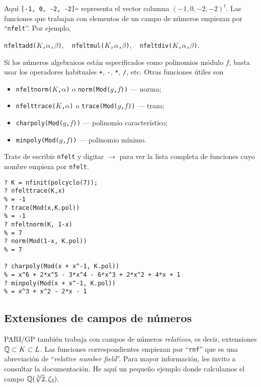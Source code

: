 Aquí \texttt{[-1, 0, -2, -2]\textasciitilde} representa el vector columna
$(-1,0,-2,-2)^t$. Las funciones que trabajan con elementos de un campo de
números empiezan por ``\texttt{nfelt}''. Por ejemplo,
\begin{center}
\texttt{nfeltadd($K$,$\alpha$,$\beta$)}, ~
\texttt{nfeltmul($K$,$\alpha$,$\beta$)}, ~
\texttt{nfeltdiv($K$,$\alpha$,$\beta$)}.
\end{center}
Si los números algebraicos están especificados como polinomios módulo $f$, basta
usar los operadores habituales \texttt{+}, \texttt{-}, \texttt{*}, \texttt{/},
etc. Otras funciones útiles son
\begin{itemize}
\item \texttt{nfeltnorm($K$,$\alpha$)} o \texttt{norm(Mod($g$,$f$))} --- norma;
\item \texttt{nfelttrace($K$,$\alpha$)} o \texttt{trace(Mod($g$,$f$))} --- traza;
\item \texttt{charpoly(Mod($g$,$f$))} --- polinomio característico;
\item \texttt{minpoly(Mod($g$,$f$))} --- polinomio mínimo.
\end{itemize}
Trate de escribir \texttt{nfelt} y digitar $\boxed{\to}$ para ver la lista
completa de funciones cuyo nombre empieza por \texttt{nfelt}.

\begin{shaded}
\begin{verbatim}
? K = nfinit(polcyclo(7));
? nfelttrace(K,x)
% = -1
? trace(Mod(x,K.pol))
% = -1
? nfeltnorm(K, 1-x)
% = 7
? norm(Mod(1-x, K.pol))
% = 7

? charpoly(Mod(x + x^-1, K.pol))
% = x^6 + 2*x^5 - 3*x^4 - 6*x^3 + 2*x^2 + 4*x + 1
? minpoly(Mod(x + x^-1, K.pol))
% = x^3 + x^2 - 2*x - 1
\end{verbatim}
\end{shaded}


\subsection{Extensiones de campos de números}

PARI/GP también trabaja con campos de números \emph{relativos}, es decir,
extensiones $\mathbb{Q} \subset K \subset L$. Las funciones correspondientes empiezan
por ``\texttt{rnf}'' que es una abreviación de ``\emph{relative number field}''.
Para mayor información, les invito a consultar la documentación. He aquí un
pequeño ejemplo donde calculamos el campo $\mathbb{Q} (\sqrt[3]{2},\zeta_3)$.

